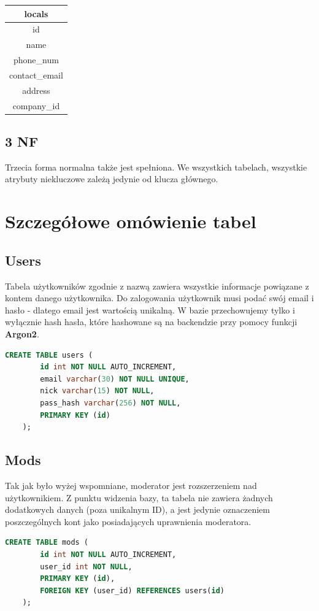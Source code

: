 \documentclass{report}
\begin{document}
\begin{tabular}{|c|}
    \hline
    \textbf{locals} \\
    \hline \hline
    id \\
    \hline
    name \\
    \hline
    phone\_num \\
    \hline
    contact\_email \\
    \hline
    address \\
    \hline
    company\_id \\
    \hline
\end{tabular}

\subsection*{3 NF}
Trzecia forma normalna także jest spełniona. We wszystkich tabelach,
wszystkie atrybuty niekluczowe zależą jedynie od klucza głównego.

\section*{Szczegółowe omówienie tabel}
\subsection*{Users}
Tabela użytkowników zgodnie z nazwą zawiera wszystkie informacje
powiązane z kontem danego użytkownika. Do zalogowania użytkownik
musi podać swój email i hasło - dlatego email jest wartością
unikalną. W bazie przechowujemy tylko i wyłącznie hash hasła,
które hashowane są na backendzie przy pomocy funkcji \textbf{Argon2}.
\begin{lstlisting}[language=SQL]
    CREATE TABLE users (
        id int NOT NULL AUTO_INCREMENT,
        email varchar(30) NOT NULL UNIQUE, 
        nick varchar(15) NOT NULL,
        pass_hash varchar(256) NOT NULL,
        PRIMARY KEY (id)
    );
\end{lstlisting}

\subsection*{Mods}
Tak jak było wyżej wspomniane, moderator jest rozszerzeniem nad
użytkownikiem. Z punktu widzenia bazy, ta tabela nie zawiera żadnych
dodatkowych danych (poza unikalnym ID), a jest jedynie oznaczeniem
poszczególnych kont jako posiadających uprawnienia moderatora.
\begin{lstlisting}[language=SQL]
    CREATE TABLE mods (
        id int NOT NULL AUTO_INCREMENT, 
        user_id int NOT NULL,
        PRIMARY KEY (id),
        FOREIGN KEY (user_id) REFERENCES users(id)
    );
\end{lstlisting}
\end{document}
